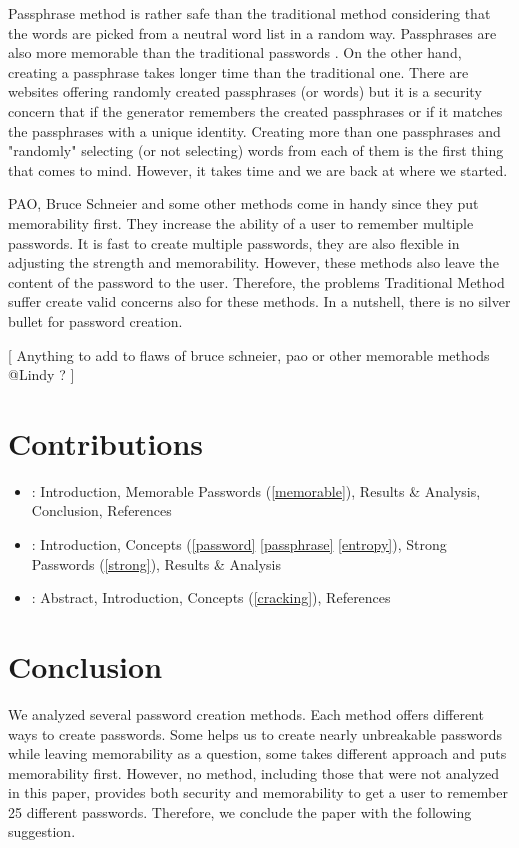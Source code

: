 \documentclass[acmsmall,nonacm]{acmart}
\begin{document}
Passphrase method is rather safe than the traditional method considering that the words are picked from a neutral word list in a random way. Passphrases are also more memorable than the traditional passwords \cite{fernandes_2021}. On the other hand, creating a passphrase takes longer time than the traditional one. There are websites offering randomly created passphrases (or words) but it is a security concern that if the generator remembers the created passphrases or if it matches the passphrases with a unique identity. Creating more than one passphrases and "randomly" selecting (or not selecting) words from each of them is the first thing that comes to mind. However, it takes time and we are back at where we started.

PAO, Bruce Schneier and some other methods come in handy since they put memorability first. They increase the ability of a user to remember multiple passwords. It is fast to create multiple passwords, they are also flexible in adjusting the strength and memorability. However, these methods also leave the content of the password to the user. Therefore, the problems Traditional Method suffer create valid concerns also for these methods. In a nutshell, there is no silver bullet for password creation.

\textcolor{beaver}{[ Anything to add to flaws of bruce schneier, pao or other memorable methods @Lindy ? ]} 

\section{Contributions}
\begin{itemize}
\item{: Introduction, Memorable Passwords (\ref{memorable}), Results \& Analysis, Conclusion, References}
\item{: Introduction, Concepts (\ref{password} \ref{passphrase}  \ref{entropy}), Strong Passwords (\ref{strong}), Results \& Analysis}
\item{: Abstract, Introduction, Concepts (\ref{cracking}),  References}
\end{itemize}

\section{Conclusion}

We analyzed several password creation methods. Each method offers different ways to create passwords. Some helps us to create nearly unbreakable passwords while leaving memorability as a question, some takes different approach and puts memorability first. However, no method, including those that were not analyzed in this paper, provides both security and memorability to get a user to remember 25 different passwords. Therefore, we conclude the paper with the following suggestion.
\end{document}
